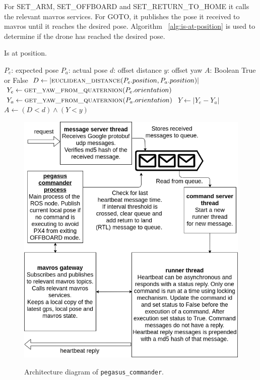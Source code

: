 For SET\_ARM, SET\_OFFBOARD and SET\_RETURN\_TO\_HOME it calls the relevant mavros services. For GOTO, it publishes the pose it received to mavros until it reaches the desired pose. Algorithm ~\ref{alg:is-at-position} is used to determine if the drone has reached the desired pose.

\renewcommand{\algorithmicrequire}{\textbf{Input:}}
\renewcommand{\algorithmicensure}{\textbf{Output:}}
\renewcommand{\algorithmicforall}{\textbf{for each}}
\begin{algorithm}
	\caption{Is at position.}
	\label{alg:is-at-position}
	\begin{algorithmic}
		\REQUIRE $P_e$: expected pose 
		\REQUIRE $P_a$: actual pose
		\REQUIRE $d$: offset distance
		\REQUIRE $y$: offset yaw
		\ENSURE $A$: Boolean True or False 
		\STATE $D \gets |\textsc{euclidean\_distance}(P_e.position, P_a.position)|$
		\STATE $Y_e \gets \textsc{get\_yaw\_from\_quaternion}(P_e.orientation) $
		\STATE $Y_a \gets \textsc{get\_yaw\_from\_quaternion}(P_a.orientation) $
		\STATE $Y \gets |Y_e - Y_a|$
		\STATE $A \gets (D < d) \land (Y < y)$
	\end{algorithmic}
\end{algorithm}

\begin{figure}
	\centering
	\caption[Architecture diagram of\texttt{ pegasus\_commander}.]{\small Architecture diagram of \texttt{pegasus\_commander}.} 
	\includegraphics[width=5in]{figures/methodology/methodology-pegasus-commander}
	\label{fig:pegasus-commander}
\end{figure}

